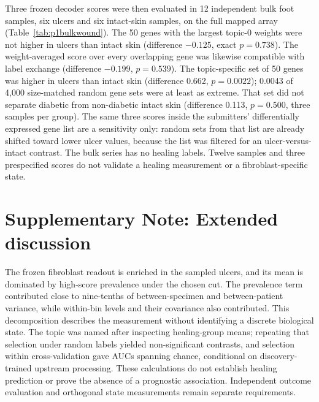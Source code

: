 \documentclass[10pt,a4paper]{article}
\begin{document}
Three frozen decoder scores were then evaluated in 12 independent bulk foot samples, six ulcers and six intact-skin samples, on the full mapped array (Table~\ref{tab:p1bulkwound}). The 50 genes with the largest topic-0 weights were not higher in ulcers than intact skin (difference $-0.125$, exact $p=0.738$). The weight-averaged score over every overlapping gene was likewise compatible with label exchange (difference $-0.199$, $p=0.539$). The topic-specific set of 50 genes was higher in ulcers than intact skin (difference 0.662, $p=0.0022$); 0.0043 of 4,000 size-matched random gene sets were at least as extreme. That set did not separate diabetic from non-diabetic intact skin (difference 0.113, $p=0.500$, three samples per group). The same three scores inside the submitters' differentially expressed gene list are a sensitivity only: random sets from that list are already shifted toward lower ulcer values, because the list was filtered for an ulcer-versus-intact contrast. The bulk series has no healing labels. Twelve samples and three prespecified scores do not validate a healing measurement or a fibroblast-specific state.



\section*{Supplementary Note: Extended discussion}

The frozen fibroblast readout is enriched in the sampled ulcers, and its mean is dominated by high-score prevalence under the chosen cut. The prevalence term contributed close to nine-tenths of between-specimen and between-patient variance, while within-bin levels and their covariance also contributed. This decomposition describes the measurement without identifying a discrete biological state. The topic was named after inspecting healing-group means; repeating that selection under random labels yielded non-significant contrasts, and selection within cross-validation gave AUCs spanning chance, conditional on discovery-trained upstream processing. These calculations do not establish healing prediction or prove the absence of a prognostic association. Independent outcome evaluation and orthogonal state measurements remain separate requirements.
\end{document}
